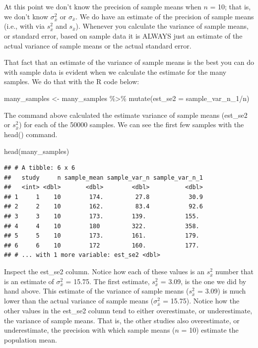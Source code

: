 \documentclass[
]{krantz}
\makeatletter
\newenvironment{Shaded}{\begin{snugshade}}{\end{snugshade}}
\newcommand{\AttributeTok}[1]{\textcolor[rgb]{0.61,0.61,0.61}{#1}}
\newcommand{\FunctionTok}[1]{\textcolor[rgb]{0,0,0}{#1}}
\newcommand{\NormalTok}[1]{#1}
\newcommand{\OtherTok}[1]{\textcolor[rgb]{0.37,0.37,0.37}{#1}}
\newcommand{\SpecialCharTok}[1]{\textcolor[rgb]{0,0,0}{#1}}
\newenvironment{kframe}{%
\medskip{}
\setlength{\fboxsep}{.8em}
 \def\at@end@of@kframe{}%
 \ifinner\ifhmode%
  \def\at@end@of@kframe{\end{minipage}}%
  \begin{minipage}{\columnwidth}%
 \fi\fi%
 \def\FrameCommand##1{\hskip\@totalleftmargin \hskip-\fboxsep
 \colorbox{shadecolor}{##1}\hskip-\fboxsep
     \hskip-\linewidth \hskip-\@totalleftmargin \hskip\columnwidth}%
 \MakeFramed {\advance\hsize-\width
   \@totalleftmargin\z@ \linewidth\hsize
   \@setminipage}}%
 {\par\unskip\endMakeFramed%
 \at@end@of@kframe}
\renewenvironment{Shaded}{\begin{kframe}}{\end{kframe}}
\makeatother
\begin{document}
At this point we don't know the precision of sample means when \(n\) = 10; that is, we don't know \(\sigma_{\bar{x}}^2\) or \(\sigma_{\bar{x}}\). We do have an estimate of the precision of sample means (i.e., with via \(s_{\bar{x}}^2\) and \(s_{\bar{x}}\)). Whenever you calculate the variance of sample means, or standard error, based on sample data it is ALWAYS just an estimate of the actual variance of sample means or the actual standard error.

That fact that an estimate of the variance of sample means is the best you can do with sample data is evident when we calculate the estimate for the many samples. We do that with the R code below:

\begin{Shaded}
\begin{Highlighting}[]
\NormalTok{many\_samples }\OtherTok{\textless{}{-}}\NormalTok{ many\_samples }\SpecialCharTok{\%\textgreater{}\%} 
   \FunctionTok{mutate}\NormalTok{(}\AttributeTok{est\_se2 =}\NormalTok{ sample\_var\_n\_1}\SpecialCharTok{/}\NormalTok{n)}
\end{Highlighting}
\end{Shaded}

The command above calculated the estimate variance of sample means (est\_se2 or \(s_{\bar{x}}^2\)) for each of the 50000 samples. We can see the first few samples with the head() command.

\begin{Shaded}
\begin{Highlighting}[]
\FunctionTok{head}\NormalTok{(many\_samples)}
\end{Highlighting}
\end{Shaded}

\begin{verbatim}
## # A tibble: 6 x 6
##   study     n sample_mean sample_var_n sample_var_n_1
##   <int> <dbl>       <dbl>        <dbl>          <dbl>
## 1     1    10        174.         27.8           30.9
## 2     2    10        162.         83.4           92.6
## 3     3    10        173.        139.           155. 
## 4     4    10        180         322.           358. 
## 5     5    10        173.        161.           179. 
## 6     6    10        172         160.           177. 
## # ... with 1 more variable: est_se2 <dbl>
\end{verbatim}

Inspect the est\_se2 column. Notice how each of these values is an \(s_{\bar{x}}^2\) number that is an estimate of \(\sigma_{\bar{x}}^2\) = 15.75. The first estimate, \(s_{\bar{x}}^2\) = 3.09, is the one we did by hand above. This estimate of the variance of sample means (\(s_{\bar{x}}^2\) = 3.09) is much lower than the actual variance of sample means (\(\sigma_{\bar{x}}^2\) = 15.75). Notice how the other values in the est\_se2 column tend to either overestimate, or underestimate, the variance of sample means. That is, the other studies also overestimate, or underestimate, the precision with which sample means (\(n\) = 10) estimate the population mean.
\end{document}
